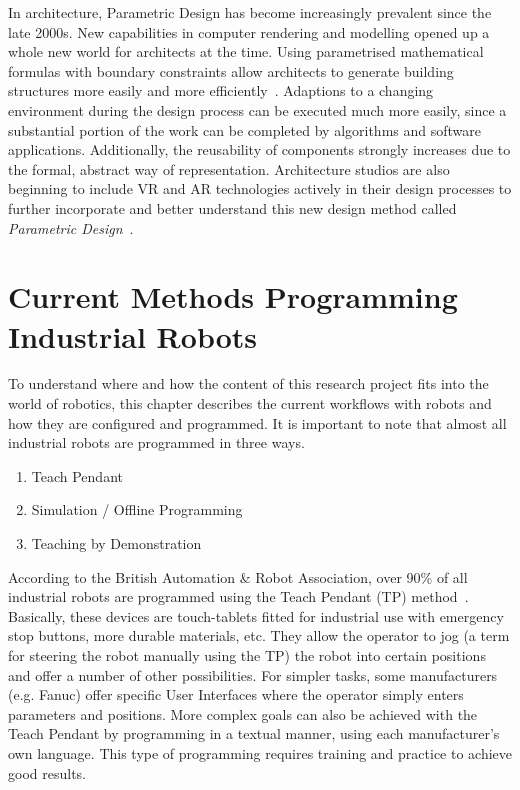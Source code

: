 In architecture, Parametric Design has become increasingly prevalent since the late 2000s. New capabilities in computer rendering and modelling opened up a whole new world for architects at the time. Using parametrised mathematical formulas with boundary constraints allow architects to generate building structures more easily and more efficiently~\cite{stavric2011parametric}. Adaptions to a changing environment during the design process can be executed much more easily, since a substantial portion of the work can be completed by algorithms and software applications. Additionally, the reusability of components strongly increases due to the formal, abstract way of representation. Architecture studios are also beginning to include VR and AR technologies actively in their design processes to further incorporate and better understand this new design method called \textit{Parametric Design}~\cite{seichterDigitalDesignArch, salimSystemArchMR, wangFrameworkMXBIM}. 


\section{Current Methods Programming Industrial Robots}
To understand where and how the content of this research project fits into the world of robotics, this chapter describes the current workflows with robots and how they are configured and programmed. It is important to note that almost all industrial robots are programmed in three ways.
\begin{enumerate}
	\setcounter{enumi}{0}
	\setlength\itemsep{-1em}
	\item Teach Pendant
	\item Simulation / Offline Programming
	\item Teaching by Demonstration
\end{enumerate}

According to the British Automation \& Robot Association, over 90\% of all industrial robots are programmed using the Teach Pendant (TP) method~\cite{bara}. Basically, these devices are touch-tablets fitted for industrial use with emergency stop buttons, more durable materials, etc. They allow the operator to jog (a term for steering the robot manually using the TP) the robot into certain positions and offer a number of other possibilities. For simpler tasks, some manufacturers (e.g. Fanuc) offer specific User Interfaces where the operator simply enters parameters and positions. More complex goals can also be achieved with the Teach Pendant by programming in a textual manner, using each manufacturer's own language. This type of programming requires training and practice to achieve good results.


